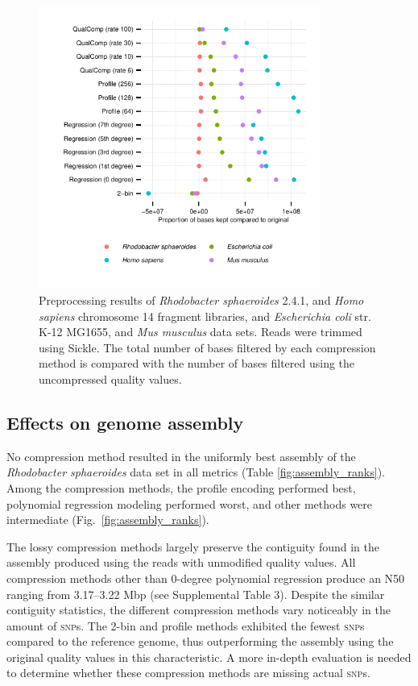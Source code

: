 \documentclass{bioinfo}
\begin{document}
\begin{figure}[!tbp]
\centerline{\includegraphics[width=3.65in]{preprocessing_results.pdf}}
\caption{Preprocessing results of \textit{Rhodobacter sphaeroides}
  2.4.1, and \textit{Homo sapiens} chromosome 14 fragment libraries,
  and \textit{Escherichia coli} str. K-12 MG1655, and \textit{Mus
    musculus} data sets. Reads were trimmed using Sickle. The total
  number of bases filtered by each compression method is compared with
  the number of bases filtered using the uncompressed quality values.}
  \label{fig:preprocessing}
\end{figure}

\subsection{Effects on genome assembly}

No compression method resulted in the uniformly best assembly of the
\textit{Rhodobacter sphaeroides} data set in all metrics (Table
\ref{fig:assembly_ranks}). Among the compression methods, the profile
encoding performed best, polynomial regression modeling performed
worst, and other methods were intermediate
(Fig.~\ref{fig:assembly_ranks}).

The lossy compression methods largely preserve the contiguity found in
the assembly produced using the reads with unmodified quality
values. All compression methods other than 0-degree polynomial
regression produce an N50 ranging from 3.17--3.22 Mbp (see
Supplemental Table 3). Despite the similar contiguity statistics, the
different compression methods vary noticeably in the amount of
\textsc{snp}s. The 2-bin and profile methods exhibited the fewest
\textsc{snp}s compared to the reference genome, thus outperforming the
assembly using the original quality values in this characteristic. A
more in-depth evaluation is needed to determine whether these
compression methods are missing actual \textsc{snp}s.
\end{document}
